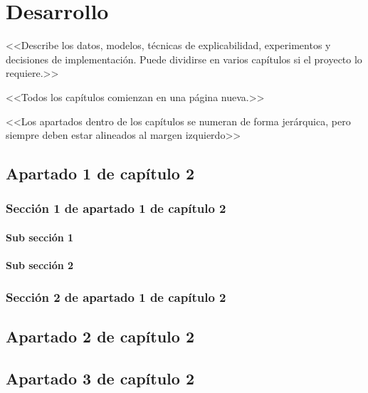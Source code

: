 \chapter{Desarrollo} \label{chp:desarrollo}

<<Describe los datos, modelos, técnicas de explicabilidad, experimentos y decisiones de implementación. Puede dividirse en varios capítulos si el proyecto lo requiere.>>

<<Todos los capítulos comienzan en una página nueva.>>

<<Los apartados dentro de los capítulos se numeran de forma jerárquica, pero siempre deben estar alineados al margen izquierdo>>

\section{Apartado 1 de capítulo 2}

\subsection{Sección 1 de apartado 1 de capítulo 2}

\subsubsection{Sub sección 1}

\subsubsection{Sub sección 2}

\subsection{Sección 2 de apartado 1 de capítulo 2}

\section{Apartado 2 de capítulo 2}

\section{Apartado 3 de capítulo 2}

